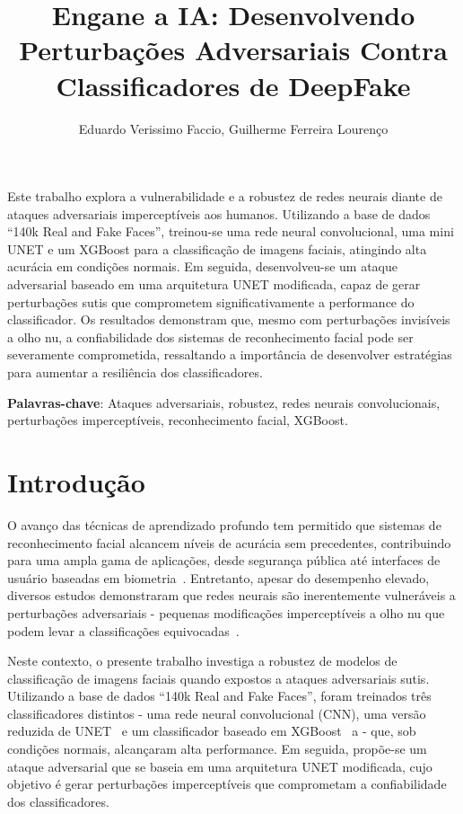 \documentclass[12pt]{article}
\title{Engane a IA: Desenvolvendo Perturbações Adversariais Contra Classificadores de DeepFake}
\author{Eduardo Verissimo Faccio, Guilherme Ferreira Lourenço}
\begin{document}
\maketitle

\begin{resumo}
  Este trabalho explora a vulnerabilidade e a robustez de redes neurais diante de ataques adversariais
  imperceptíveis aos humanos. Utilizando a base de dados “140k Real and Fake Faces”, treinou-se uma rede
  neural convolucional, uma mini UNET e um XGBoost para a classificação de imagens faciais, atingindo alta
  acurácia em condições normais. Em seguida, desenvolveu-se um ataque adversarial baseado em uma arquitetura
  UNET modificada, capaz de gerar perturbações sutis que comprometem significativamente a performance do classificador.
  Os resultados demonstram que, mesmo com perturbações invisíveis a olho nu, a confiabilidade dos sistemas de reconhecimento
  facial pode ser severamente comprometida, ressaltando a importância de desenvolver estratégias para aumentar
  a resiliência dos classificadores.

  \textbf{Palavras-chave}: Ataques adversariais, robustez, redes neurais convolucionais, perturbações imperceptíveis, reconhecimento facial, XGBoost.
\end{resumo}

\section{Introdução}

O avanço das técnicas de aprendizado profundo tem permitido que sistemas de
reconhecimento facial alcancem níveis de acurácia sem precedentes, contribuindo
para uma ampla gama de aplicações, desde segurança pública até interfaces de
usuário baseadas em biometria~\cite{parkhi2015deep}. Entretanto, apesar do
desempenho elevado, diversos estudos demonstraram que redes neurais são
inerentemente vulneráveis a perturbações adversariais - pequenas modificações
imperceptíveis a olho nu que podem levar a classificações
equivocadas~\cite{szegedy2014intriguingpropertiesneuralnetworks,goodfellow2015explainingharnessingadversarialexamples}.

Neste contexto, o presente trabalho investiga a robustez de modelos de
classificação de imagens faciais quando expostos a ataques adversariais sutis.
Utilizando a base de dados ``140k Real and Fake Faces'', foram treinados três
classificadores distintos - uma rede neural convolucional (CNN), uma versão
reduzida de UNET~\cite{} e um classificador baseado em XGBoost~\cite{Chen_2016}
a - que, sob condições normais, alcançaram alta performance. Em seguida,
propõe-se um ataque adversarial que se baseia em uma arquitetura UNET
modificada, cujo objetivo é gerar perturbações imperceptíveis que comprometam a
confiabilidade dos classificadores.
\end{document}

